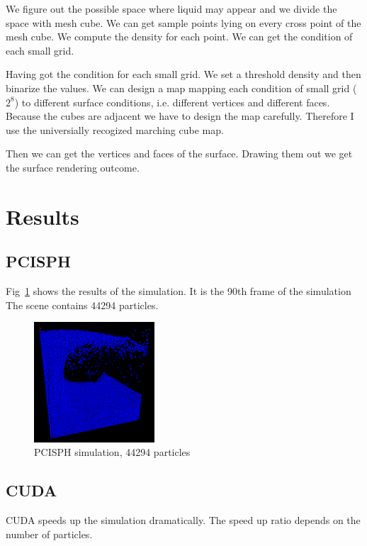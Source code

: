 \documentclass[acmtog]{acmart}
\begin{document}
We figure out the possible space where liquid may appear and we divide the space with mesh cube. We can get sample points lying on
every cross point of the mesh cube. We compute the density for each point. We can get the condition of each small grid.

Having got the condition for each small grid. We set a threshold density and then binarize the values. We can design a map mapping each condition of small grid ($2^8$) to
different surface conditions, i.e. different vertices and different faces. Because the cubes are adjacent we have to design the map carefully.
Therefore I use the universially recogized marching cube map.

Then we can get the vertices and faces of the surface. Drawing them out we get the surface rendering outcome.

\section{Results}

\subsection{PCISPH}

Fig~\ref{fig:particle} shows the results of the simulation.
It is the 90th frame of the simulation
The scene contains 44294 particles.

\begin{figure}[h]
	\centering
	\includegraphics[width=0.40\textwidth]{particle.png}
	\caption{PCISPH simulation, 44294 particles}
	\label{fig:particle}
\end{figure}

\subsection{CUDA}

CUDA speeds up the simulation dramatically.
The speed up ratio depends on the number of particles.
\end{document}
